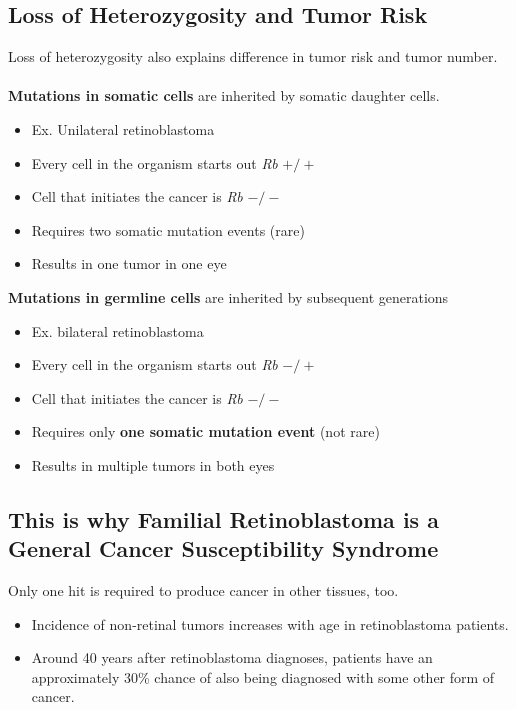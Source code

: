 \documentclass[10pt]{article}
\begin{document}
\subsection*{Loss of Heterozygosity and Tumor Risk}
Loss of heterozygosity also explains difference in tumor risk and tumor number.\\\\
\textbf{Mutations in somatic cells} are inherited by somatic daughter cells.
\begin{itemize}
	\item Ex. Unilateral retinoblastoma
	\item Every cell in the organism starts out \textit{Rb} $+/+$
	\item Cell that initiates the cancer is \textit{Rb} $-/-$
	\item Requires two somatic mutation events (rare)
	\item Results in one tumor in one eye
\end{itemize}
\textbf{Mutations in germline cells} are inherited by subsequent generations
\begin{itemize}
	\item Ex. bilateral retinoblastoma
	\item Every cell in the organism starts out \textit{Rb} $-/+$
	\item Cell that initiates the cancer is \textit{Rb} $-/-$
	\item Requires only \textbf{one somatic mutation event} (not rare)
	\item Results in multiple tumors in both eyes
\end{itemize}

\subsection*{This is why Familial Retinoblastoma is a General Cancer Susceptibility Syndrome}
Only one hit is required to produce cancer in other tissues, too.
\begin{itemize}
	\item Incidence of non-retinal tumors increases with age in retinoblastoma patients.
	\item Around 40 years after retinoblastoma diagnoses, patients have an approximately 30\% chance of also being diagnosed with some other form of cancer.
\end{itemize}
\end{document}
